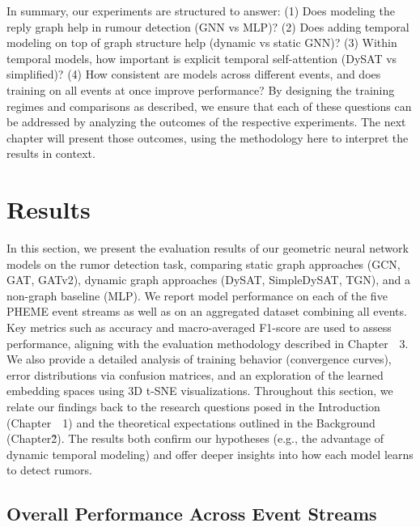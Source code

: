 \documentclass{cshonours}
\begin{document}
In summary, our experiments are structured to answer: (1) Does modeling the reply graph help in rumour detection (GNN vs MLP)? (2) Does adding temporal modeling on top of graph structure help (dynamic vs static GNN)? (3) Within temporal models, how important is explicit temporal self-attention (DySAT vs simplified)? (4) How consistent are models across different events, and does training on all events at once improve performance? By designing the training regimes and comparisons as described, we ensure that each of these questions can be addressed by analyzing the outcomes of the respective experiments. The next chapter will present those outcomes, using the methodology here to interpret the results in context.



\chapter{Results}\label{sec:results}

In this section, we present the evaluation results of our geometric neural network models on the rumor detection task, comparing static graph approaches (GCN, GAT, GATv2), dynamic graph approaches (DySAT, SimpleDySAT, TGN), and a non-graph baseline (MLP). We report model performance on each of the five PHEME event streams as well as on an aggregated dataset combining all events. Key metrics such as accuracy and macro-averaged F1-score are used to assess performance, aligning with the evaluation methodology described in Chapter~~3. We also provide a detailed analysis of training behavior (convergence curves), error distributions via confusion matrices, and an exploration of the learned embedding spaces using 3D t-SNE visualizations. Throughout this section, we relate our findings back to the research questions posed in the Introduction (Chapter~~1) and the theoretical expectations outlined in the Background (Chapter\~2). The results both confirm our hypotheses (e.g., the advantage of dynamic temporal modeling) and offer deeper insights into how each model learns to detect rumors.

\section{Overall Performance Across Event Streams}
\end{document}
